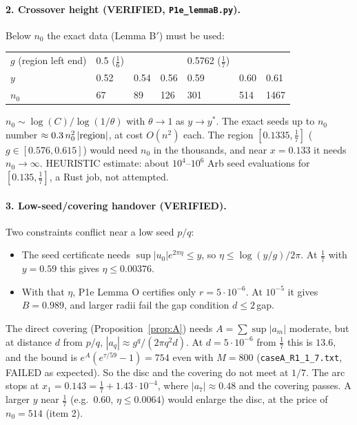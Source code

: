 \documentclass[11pt]{article}
\theoremstyle{remark}\newtheorem{remark}[theorem]{Remark}
\begin{document}
\paragraph{2. Crossover height (VERIFIED, \texttt{P1e\_lemmaB.py}).} Below $n_0$ the exact data (Lemma B$'$) must be used:
\begin{center}\small\begin{tabular}{lllllll}\toprule
$g$ (region left end) & 0.5 ($\frac16$) & & & 0.5762 ($\frac17$) & & \\
$y$ & 0.52 & 0.54 & 0.56 & 0.59 & 0.60 & 0.61\\
$n_0$ & 67 & 89 & 126 & 301 & 514 & 1467\\\bottomrule
\end{tabular}\end{center}
$n_0\sim\log(C)/\log(1/\theta)$ with $\theta\to1$ as $y\to y^*$. The exact seeds up to $n_0$ number $\approx0.3\,n_0^2\,|{\rm region}|$, at cost $O(n^2)$ each.
The region $[0.1335,\frac17]$ ($g\in[0.576,0.615]$) would need $n_0$ in the thousands, and near $x=0.133$ it needs $n_0\to\infty$. HEURISTIC estimate: about $10^4$--$10^6$ Arb seed evaluations for $[0.135,\frac17]$, a Rust job, not attempted.

\paragraph{3. Low-seed/covering handover (VERIFIED).} Two constraints conflict near a low seed $p/q$:
\begin{itemize}
\item The seed certificate needs $\sup|u_0|e^{2\pi\eta}\le y$, so $\eta\le\log(y/g)/2\pi$. At $\frac17$ with $y=0.59$ this gives $\eta\le0.00376$.
\item With that $\eta$, P1e Lemma O certifies only $r=5\cdot10^{-6}$. At $10^{-5}$ it gives $B=0.989$, and larger radii fail the gap condition $d\le2\,$gap.
\end{itemize}
The direct covering (Proposition~\ref{prop:A}) needs $A=\sum\sup|a_m|$ moderate, but at distance $d$ from $p/q$, $|a_q|\approx g^q/(2\pi q^2d)$. At $d=5\cdot10^{-6}$ from $\frac17$ this is $13.6$, and the bound is $e^A(e^{\tau/59}-1)=754$ even with $M=800$ (\texttt{caseA\_R1\_1\_7.txt}, FAILED as expected).
So the disc and the covering do not meet at $1/7$. The arc stops at $x_1=0.143=\frac17+1.43\cdot10^{-4}$, where $|a_7|\approx0.48$ and the covering passes.
A larger $y$ near $\frac17$ (e.g.\ $0.60$, $\eta\le0.0064$) would enlarge the disc, at the price of $n_0=514$ (item 2).
\end{document}
